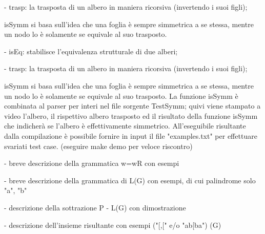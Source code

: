 \documentclass[a4paper, oneside, 11pt]{article}
\begin{document}
- trasp: la trasposta di un albero in maniera ricorsiva (invertendo i suoi figli);

isSymm si basa sull'idea che una foglia \`e sempre simmetrica a se stessa, mentre un nodo lo \`e solamente se equivale al suo trasposto.


- isEq: stabilisce l'equivalenza strutturale di due alberi;

- trasp: la trasposta di un albero in maniera ricorsiva (invertendo i suoi figli);

isSymm si basa sull'idea che una foglia \`e sempre simmetrica a se stessa, mentre un nodo lo \`e solamente se equivale al suo trasposto.
   La funzione isSymm \`e combinata al parser per interi nel file sorgente TestSymm; quivi viene stampato a video l'albero, il rispettivo albero trasposto ed il risultato della funzione isSymm che indicherà se l'albero \`e effettivamente simmetrico.
  All'eseguibile risultante dalla compilazione \`e possibile fornire in input il file "examples.txt" per effettuare svariati test case.
  (eseguire make demo per veloce riscontro)

  - breve descrizione della grammatica w=wR con esempi

- breve descrizione della grammatica di L(G) con esempi, di cui palindrome solo "a", "b"

- descrizione della sottrazione P - L(G) con dimostrazione

- descrizione dell'insieme risultante con esempi ("[,[" e/o "ab[ba")
  (G)
\end{document}
